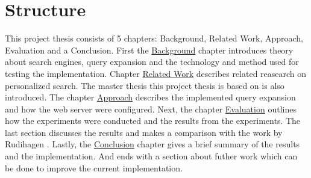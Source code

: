 \section{Structure}
This project thesis consists of 5 chapters: Background, Related Work, Approach, Evaluation and a Conclusion.
First the \hyperref[ch:background]{Background} chapter introduces theory about search engines,
query expansion and the technology and method used for testing the implementation.
Chapter \hyperref[ch:related-work]{Related Work} describes related reasearch on personalized search.
The master thesis this project thesis is based on is also introduced.
The chapter \hyperref[ch:approach]{Approach} describes the implemented query expansion and how the web server were configured.
Next, the chapter \hyperref[ch:evaluation]{Evaluation} outlines how the experiments were conducted and the results from the experiments.
The last section discusses the results and makes a comparison with the work by Rudihagen \cite{master-thesis}.
Lastly, the \hyperref[ch:conclusion]{Conclusion} chapter gives a brief summary of the results and the implementation.
And ends with a section about futher work which can be done to improve the current implementation.

